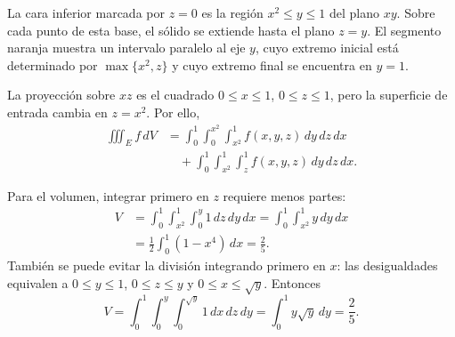 \begin{samepage}
\begin{center}
\end{center}
\endgroup

La cara inferior marcada por $z=0$ es la región $x^2\leq y\leq1$ del plano $xy$. Sobre cada punto de esta base, el sólido se extiende hasta el plano $z=y$. El segmento naranja muestra un intervalo paralelo al eje $y$, cuyo extremo inicial está determinado por $\max\{x^2,z\}$ y cuyo extremo final se encuentra en $y=1$.
\end{samepage}

La proyección sobre $xz$ es el cuadrado $0\leq x\leq1$, $0\leq z\leq1$, pero la superficie de entrada cambia en $z=x^2$. Por ello,
\begin{align*}
\iiint_E f\,dV
&=\int_0^1\int_0^{x^2}\int_{x^2}^1 f(x,y,z)\,dy\,dz\,dx\\
&\quad+\int_0^1\int_{x^2}^1\int_z^1 f(x,y,z)\,dy\,dz\,dx.
\end{align*}

\begingroup
\shorthandoff{>}
\begin{center}
\end{center}
\endgroup

Para el volumen, integrar primero en $z$ requiere menos partes:
\begin{align*}
V&=\int_0^1\int_{x^2}^1\int_0^y1\,dz\,dy\,dx
=\int_0^1\int_{x^2}^1 y\,dy\,dx\\
&=\frac12\int_0^1(1-x^4)\,dx=\frac25.
\end{align*}
También se puede evitar la división integrando primero en $x$: las desigualdades equivalen a $0\leq y\leq1$, $0\leq z\leq y$ y $0\leq x\leq\sqrt y$. Entonces
\[
V=\int_0^1\int_0^y\int_0^{\sqrt y}1\,dx\,dz\,dy
=\int_0^1 y\sqrt y\,dy=\frac25.
\]

